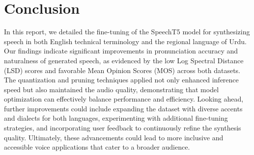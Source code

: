 \documentclass[conference]{IEEEtran}
\begin{document}
\section{Conclusion}
In this report, we detailed the fine-tuning of the SpeechT5 model for synthesizing speech in both English technical terminology and the regional language of Urdu. Our findings indicate significant improvements in pronunciation accuracy and naturalness of generated speech, as evidenced by the low Log Spectral Distance (LSD) scores and favorable Mean Opinion Scores (MOS) across both datasets. The quantization and pruning techniques applied not only enhanced inference speed but also maintained the audio quality, demonstrating that model optimization can effectively balance performance and efficiency. Looking ahead, further improvements could include expanding the dataset with diverse accents and dialects for both languages, experimenting with additional fine-tuning strategies, and incorporating user feedback to continuously refine the synthesis quality. Ultimately, these advancements could lead to more inclusive and accessible voice applications that cater to a broader audience.
\end{document}
